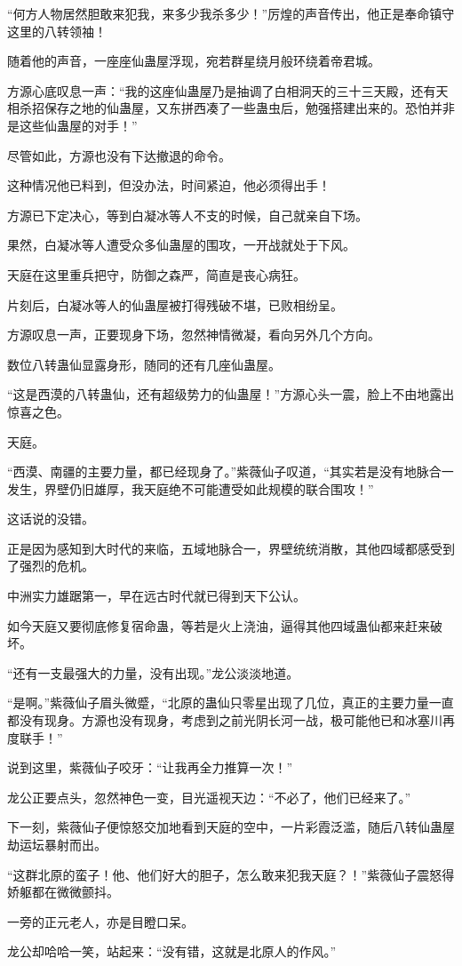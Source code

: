 \begin{this_body}
“何方人物居然胆敢来犯我，来多少我杀多少！”厉煌的声音传出，他正是奉命镇守这里的八转领袖！

随着他的声音，一座座仙蛊屋浮现，宛若群星绕月般环绕着帝君城。

方源心底叹息一声：“我的这座仙蛊屋乃是抽调了白相洞天的三十三天殿，还有天相杀招保存之地的仙蛊屋，又东拼西凑了一些蛊虫后，勉强搭建出来的。恐怕并非是这些仙蛊屋的对手！”

尽管如此，方源也没有下达撤退的命令。

这种情况他已料到，但没办法，时间紧迫，他必须得出手！

方源已下定决心，等到白凝冰等人不支的时候，自己就亲自下场。

果然，白凝冰等人遭受众多仙蛊屋的围攻，一开战就处于下风。

天庭在这里重兵把守，防御之森严，简直是丧心病狂。

片刻后，白凝冰等人的仙蛊屋被打得残破不堪，已败相纷呈。

方源叹息一声，正要现身下场，忽然神情微凝，看向另外几个方向。

数位八转蛊仙显露身形，随同的还有几座仙蛊屋。

“这是西漠的八转蛊仙，还有超级势力的仙蛊屋！”方源心头一震，脸上不由地露出惊喜之色。

天庭。

“西漠、南疆的主要力量，都已经现身了。”紫薇仙子叹道，“其实若是没有地脉合一发生，界壁仍旧雄厚，我天庭绝不可能遭受如此规模的联合围攻！”

这话说的没错。

正是因为感知到大时代的来临，五域地脉合一，界壁统统消散，其他四域都感受到了强烈的危机。

中洲实力雄踞第一，早在远古时代就已得到天下公认。

如今天庭又要彻底修复宿命蛊，等若是火上浇油，逼得其他四域蛊仙都来赶来破坏。

“还有一支最强大的力量，没有出现。”龙公淡淡地道。

“是啊。”紫薇仙子眉头微蹙，“北原的蛊仙只零星出现了几位，真正的主要力量一直都没有现身。方源也没有现身，考虑到之前光阴长河一战，极可能他已和冰塞川再度联手！”

说到这里，紫薇仙子咬牙：“让我再全力推算一次！”

龙公正要点头，忽然神色一变，目光遥视天边：“不必了，他们已经来了。”

下一刻，紫薇仙子便惊怒交加地看到天庭的空中，一片彩霞泛滥，随后八转仙蛊屋劫运坛暴射而出。

“这群北原的蛮子！他、他们好大的胆子，怎么敢来犯我天庭？！”紫薇仙子震怒得娇躯都在微微颤抖。

一旁的正元老人，亦是目瞪口呆。

龙公却哈哈一笑，站起来：“没有错，这就是北原人的作风。”

\end{this_body}

